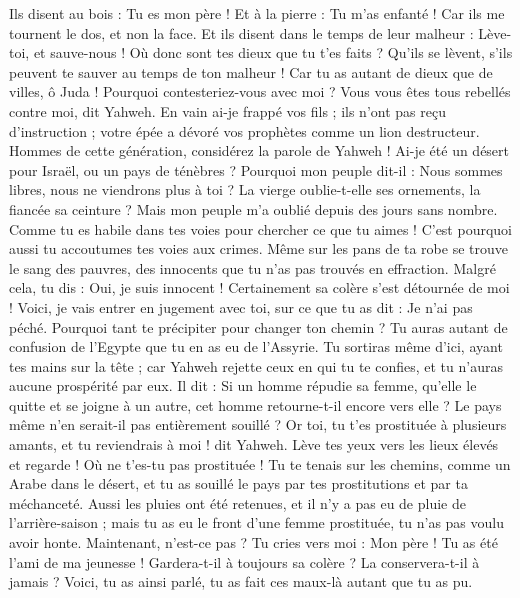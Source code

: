\begin{multicols}{2}
Ils disent au bois : Tu es mon père ! Et à la pierre : Tu m'as enfanté ! Car ils me tournent le dos, et non la face. Et ils disent dans le temps de leur malheur : Lève-toi, et sauve-nous !
Où donc sont tes dieux que tu t'es faits ? Qu’ils se lèvent, s'ils peuvent te sauver au temps de ton malheur ! Car tu as autant de dieux que de villes, ô Juda !
Pourquoi contesteriez-vous avec moi ? Vous vous êtes tous rebellés contre moi, dit Yahweh.
En vain ai-je frappé vos fils ; ils n'ont pas reçu d'instruction ; votre épée a dévoré vos prophètes comme un lion destructeur.
Hommes de cette génération, considérez la parole de Yahweh ! Ai-je été un désert pour Israël, ou un pays de ténèbres ? Pourquoi mon peuple dit-il : Nous sommes libres, nous ne viendrons plus à toi ?
La vierge oublie-t-elle ses ornements, la fiancée sa ceinture ? Mais mon peuple m'a oublié depuis des jours sans nombre.
Comme tu es habile dans tes voies pour chercher ce que tu aimes ! C’est pourquoi aussi tu accoutumes tes voies aux crimes.
Même sur les pans de ta robe se trouve le sang des pauvres, des innocents que tu n’as pas trouvés en effraction.
Malgré cela, tu dis : Oui, je suis innocent ! Certainement sa colère s'est détournée de moi ! Voici, je vais entrer en jugement avec toi, sur ce que tu as dit : Je n'ai pas péché.
Pourquoi tant te précipiter pour changer ton chemin ? Tu auras autant de confusion de l’Egypte que tu en as eu de l’Assyrie.
Tu sortiras même d'ici, ayant tes mains sur la tête ; car Yahweh rejette ceux en qui tu te confies, et tu n'auras aucune prospérité par eux.
\VerseOne{}Il dit : Si un homme répudie sa femme, qu'elle le quitte et se joigne à un autre, cet homme retourne-t-il encore vers elle ? Le pays même n'en serait-il pas entièrement souillé ? Or toi, tu t'es prostituée à plusieurs amants, et tu reviendrais à moi ! dit Yahweh.
Lève tes yeux vers les lieux élevés et regarde ! Où ne t’es-tu pas prostituée ! Tu te tenais sur les chemins, comme un Arabe dans le désert, et tu as souillé le pays par tes prostitutions et par ta méchanceté.
Aussi les pluies ont été retenues, et il n'y a pas eu de pluie de l’arrière-saison ; mais tu as eu le front d’une femme prostituée, tu n'as pas voulu avoir honte.
Maintenant, n’est-ce pas ? Tu cries vers moi : Mon père ! Tu as été l’ami de ma jeunesse !
Gardera-t-il à toujours sa colère ? La conservera-t-il à jamais ? Voici, tu as ainsi parlé, tu as fait ces maux-là autant que tu as pu.

\end{multicols}
